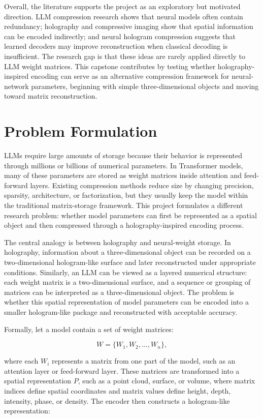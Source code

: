 \documentclass{article}
\begin{document}
\begin{normalsize}
Overall, the literature supports the project as an exploratory but motivated direction. LLM compression research shows that neural models often contain redundancy; holography and compressive imaging show that spatial information can be encoded indirectly; and neural hologram compression suggests that learned decoders may improve reconstruction when classical decoding is insufficient. The research gap is that these ideas are rarely applied directly to LLM weight matrices. This capstone contributes by testing whether holography-inspired encoding can serve as an alternative compression framework for neural-network parameters, beginning with simple three-dimensional objects and moving toward matrix reconstruction.

\section{Problem Formulation}

LLMs require large amounts of storage because their behavior is represented through millions or billions of numerical parameters. In Transformer models, many of these parameters are stored as weight matrices inside attention and feed-forward layers. Existing compression methods reduce size by changing precision, sparsity, architecture, or factorization, but they usually keep the model within the traditional matrix-storage framework. This project formulates a different research problem: whether model parameters can first be represented as a spatial object and then compressed through a holography-inspired encoding process.

The central analogy is between holography and neural-weight storage. In holography, information about a three-dimensional object can be recorded on a two-dimensional hologram-like surface and later reconstructed under appropriate conditions. Similarly, an LLM can be viewed as a layered numerical structure: each weight matrix is a two-dimensional surface, and a sequence or grouping of matrices can be interpreted as a three-dimensional object. The problem is whether this spatial representation of model parameters can be encoded into a smaller hologram-like package and reconstructed with acceptable accuracy.

Formally, let a model contain a set of weight matrices:

\[
W = \{W_1, W_2, \ldots, W_n\},
\]

where each \(W_i\) represents a matrix from one part of the model, such as an attention layer or feed-forward layer. These matrices are transformed into a spatial representation \(P\), such as a point cloud, surface, or volume, where matrix indices define spatial coordinates and matrix values define height, depth, intensity, phase, or density. The encoder then constructs a hologram-like representation:


\end{normalsize}
\end{document}
